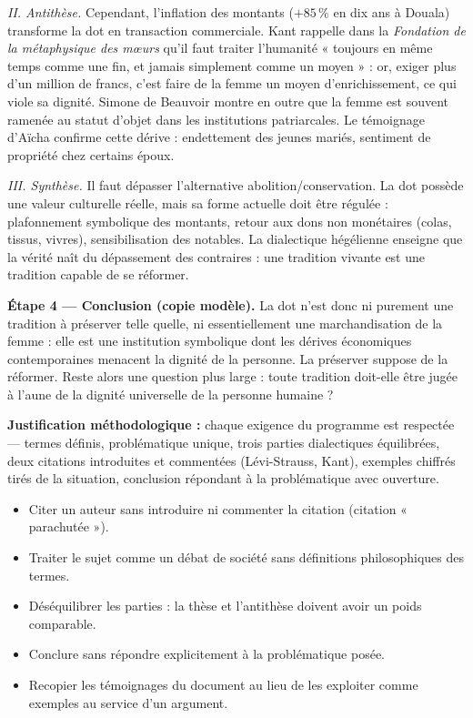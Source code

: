 \documentclass[11pt]{article}
\begin{document}
\begin{exoresolu}
\emph{II. Antithèse.} Cependant, l'inflation des montants ($+85\,\%$ en dix ans à Douala) transforme la dot en transaction commerciale. Kant rappelle dans la \emph{Fondation de la métaphysique des mœurs} qu'il faut traiter l'humanité « toujours en même temps comme une fin, et jamais simplement comme un moyen » : or, exiger plus d'un million de francs, c'est faire de la femme un moyen d'enrichissement, ce qui viole sa dignité. Simone de Beauvoir montre en outre que la femme est souvent ramenée au statut d'objet dans les institutions patriarcales. Le témoignage d'Aïcha confirme cette dérive : endettement des jeunes mariés, sentiment de propriété chez certains époux.

\emph{III. Synthèse.} Il faut dépasser l'alternative abolition/conservation. La dot possède une valeur culturelle réelle, mais sa forme actuelle doit être régulée : plafonnement symbolique des montants, retour aux dons non monétaires (colas, tissus, vivres), sensibilisation des notables. La dialectique hégélienne enseigne que la vérité naît du dépassement des contraires : une tradition vivante est une tradition capable de se réformer.

\textbf{Étape 4 — Conclusion (copie modèle).} La dot n'est donc ni purement une tradition à préserver telle quelle, ni essentiellement une marchandisation de la femme : elle est une institution symbolique dont les dérives économiques contemporaines menacent la dignité de la personne. La préserver suppose de la réformer. Reste alors une question plus large : toute tradition doit-elle être jugée à l'aune de la dignité universelle de la personne humaine ?

\textbf{Justification méthodologique :} chaque exigence du programme est respectée — termes définis, problématique unique, trois parties dialectiques équilibrées, deux citations introduites et commentées (Lévi-Strauss, Kant), exemples chiffrés tirés de la situation, conclusion répondant à la problématique avec ouverture.
\end{exoresolu}

\begin{attention}
\begin{itemize}
\item Citer un auteur sans introduire ni commenter la citation (citation « parachutée »).
\item Traiter le sujet comme un débat de société sans définitions philosophiques des termes.
\item Déséquilibrer les parties : la thèse et l'antithèse doivent avoir un poids comparable.
\item Conclure sans répondre explicitement à la problématique posée.
\item Recopier les témoignages du document au lieu de les exploiter comme exemples au service d'un argument.
\end{itemize}
\end{attention}
\end{document}
